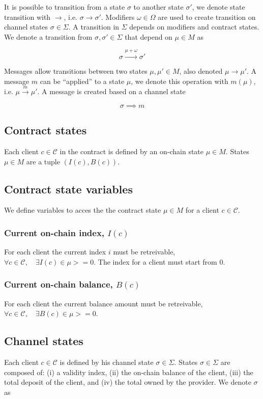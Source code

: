 \documentclass{llncs}
\begin{document}
It is possible to transition from a state $\sigma$ to another state $\sigma'$, we denote state transition with $\rightarrow$, i.e. $\sigma \rightarrow \sigma'$.  Modifiers $\omega \in \Omega$ are used to create transition on channel states $\sigma \in \Sigma$. A transition in $\Sigma$ depends on modifiers and contract states. We denote a transition from $\sigma, \sigma' \in \Sigma$ that depend on $\mu \in M$ as

$$\sigma \xrightarrow{\mu+\omega} \sigma'$$

Messages allow transitions between two states $\mu, \mu' \in M$, also denoted $\mu \rightarrow \mu '$. A message $m$ can be ``applied'' to a state $\mu$, we denote this operation with $m(\mu)$, i.e. $\mu \xrightarrow{m} \mu'$. A message is created based on a channel state

$$\sigma \implies m$$

\subsection{Contract states} Each client $c \in \mathcal{C}$ in the contract is defined by an on-chain state $\mu \in M$. States $\mu \in M$ are a tuple $(I(c), B(c))$.

\subsection{Contract state variables} We define variables to acces the the contract state $\mu \in M$ for a client $c \in \mathcal{C}$.

\subsubsection{Current on-chain index, $I(c)$} For each client the current index $i$ must be retreivable, $\forall c \in \mathcal{C}, \quad \exists I(c) \in \mu >= 0$. The index for a client must start from $0$.

\subsubsection{Current on-chain balance, $B(c)$} For each client the current balance amount must be retreivable, $\forall c \in \mathcal{C}, \quad \exists B(c) \in \mu >= 0$.

\subsection{Channel states} Each client $c \in \mathcal{C}$ is defined by his channel state $\sigma \in \Sigma$. States $\sigma \in \Sigma$ are composed of: (i) a validity index, (ii) the on-chain balance
of the client, (iii) the total deposit of the client, and (iv) the total owned by the provider. We denote $\sigma$ as
\end{document}
